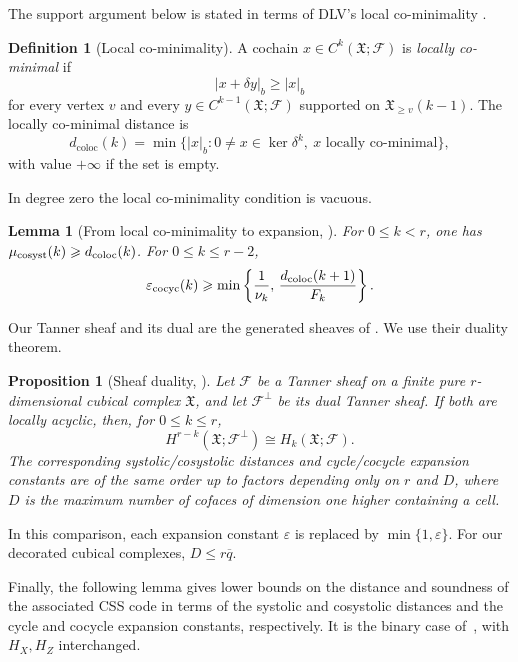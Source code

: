 \documentclass[11pt,letterpaper]{article}
\renewcommand{\le}{\leqslant}
\renewcommand{\ge}{\geqslant}
\newtheorem{lemma}[theorem]{Lemma}
\newtheorem{proposition}[theorem]{Proposition}
\theoremstyle{definition}
\newtheorem{definition}[theorem]{Definition}
\theoremstyle{remark}
\newcommand{\cF}{\mathcal F}
\newcommand{\X}{\mathfrak{X}}
\newcommand{\coloc}{\operatorname{coloc}}
\newcommand{\eps}{\varepsilon}
\begin{document}
The support argument below is stated in terms of DLV's local co-minimality
\cite[Definition~2.2]{DinurLinVidick2024}.

\begin{definition}[Local co-minimality]\label{def:local-cominimality}
A cochain $x\in C^k(\X;\cF)$ is \emph{locally co-minimal} if
\[
 |x+\delta y|_b\ge|x|_b
\]
for every vertex $v$ and every $y\in C^{k-1}(\X;\cF)$ supported
on $\X_{\ge v}(k-1)$.
The locally co-minimal distance is
\[
 d_{\coloc}(k)=\min\{|x|_b:0\ne x\in\ker\delta^k,
                       \ x\text{ locally co-minimal}\},
\]
with value $+\infty$ if the set is empty.
\end{definition}

In degree zero the local co-minimality condition is vacuous.

\begin{lemma}[From local co-minimality to expansion,
{\cite[Lemma~2.3]{DinurLinVidick2024}}]
\label{lem:cominimal-to-expansion}
For $0\le k<r$, one has
$\mu_{\rm cosyst}(k)\ge d_{\coloc}(k)$.
For $0\le k\le r-2$,
\begin{equation}
 \eps_{\rm cocyc}(k)\ge
 \min\left\{\frac1{\nu_k},\,
              \frac{d_{\coloc}(k+1)}{F_k}\right\}.
 \label{eq:cominimal-to-expansion}
\end{equation}
\end{lemma}

Our Tanner sheaf and its dual are the generated sheaves of
\cite[Definitions~3.10--3.11]{LiEtAl2025}. We use their duality theorem.
\begin{proposition}[Sheaf duality,
{\cite[Theorem~3.17]{LiEtAl2025}}]
\label{prop:sheaf-duality}\label{sec:dual-sheaf}
Let $\cF$ be a Tanner sheaf on a finite pure $r$-dimensional cubical
complex $\X$, and let $\cF^\perp$ be its dual Tanner sheaf.
If both are locally acyclic, then, for $0\le k\le r$,
\[
 H^{r-k}(\X;\cF^\perp)\cong H_k(\X;\cF).
\]
The corresponding systolic/cosystolic distances and
cycle/cocycle expansion constants are of the same order up to factors
depending only on $r$ and $D$, where $D$ is the maximum number of
cofaces of dimension one higher containing a cell.
\end{proposition}

In this comparison, each expansion constant $\eps$ is replaced by
$\min\{1,\eps\}$. For our decorated cubical complexes, $D\le r\overline q$.

Finally, the following lemma gives lower bounds on the distance and
soundness of the associated CSS code in terms of the systolic and
cosystolic distances and the cycle and cocycle expansion constants,
respectively. It is the binary case of~\cite[Lemma~2.7]{DinurLinVidick2024},
with $H_X,H_Z$ interchanged.
\end{document}
